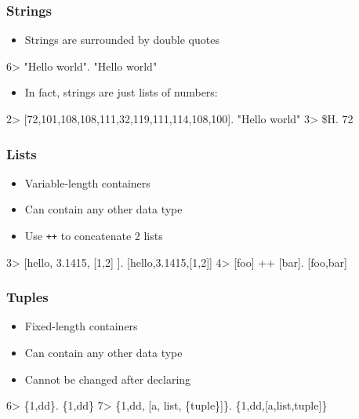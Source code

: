 \documentclass{beamer}
\begin{document}
\begin{frame}[fragile]
  \frametitle{Strings}
  \begin{itemize}
  \item Strings are surrounded by double quotes
  \end{itemize}

  \begin{semiverbatim}
6> "Hello world".
"Hello world"
  \end{semiverbatim}

  \begin{itemize}
  \item In fact, strings are just lists of numbers:
  \end{itemize}

  \begin{semiverbatim}
2> [72,101,108,108,111,32,119,111,114,108,100].
"Hello world"
3> \$H.
72
  \end{semiverbatim}

\end{frame}


\begin{frame}[fragile]
  \frametitle{Lists}
  \begin{itemize}
  \item Variable-length containers
  \item Can contain any other data type
  \item Use {\tt ++} to concatenate 2 lists
  \end{itemize}

  \begin{semiverbatim}
3> [hello, 3.1415, [1,2] ].  
[hello,3.1415,[1,2]]
4> [foo] ++ [bar].
[foo,bar]
  \end{semiverbatim}

\end{frame}


\begin{frame}[fragile]
  \frametitle{Tuples}
  \begin{itemize}
  \item Fixed-length containers
  \item Can contain any other data type
  \item Cannot be changed after declaring
  \end{itemize}

  \begin{semiverbatim}
6> \{1,dd\}.
\{1,dd\}
7> \{1,dd, [a, list, \{tuple\}]\}.
\{1,dd,[a,list,{tuple}]\}
  \end{semiverbatim}

\end{frame}

 
\end{document}
